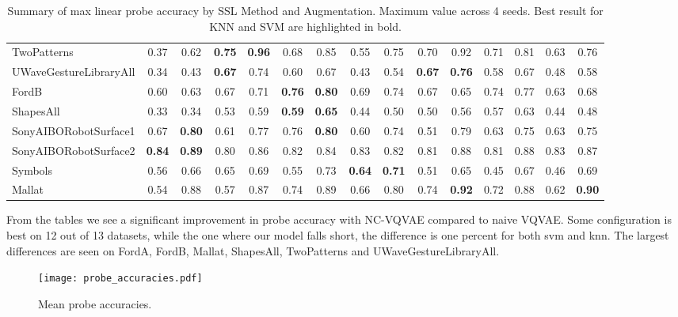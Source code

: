 \documentclass[../../thesis.tex]{subfiles}
\begin{document}
\begin{table}[H]
\begin{adjustbox}{width=\textwidth}
\begin{tabular}{lcc|cc|cc|cc|cc|cc|cc}
        TwoPatterns             & 0.37 & 0.62 & \textbf{0.75} & \textbf{0.96} & 0.68 & 0.85 & 0.55 & 0.75 & 0.70 & 0.92 & 0.71 & 0.81 & 0.63 & 0.76 \\
        UWaveGestureLibraryAll  & 0.34 & 0.43 & \textbf{0.67} & 0.74 & 0.60 & 0.67 & 0.43 & 0.54 & \textbf{0.67} & \textbf{0.76} & 0.58 & 0.67 & 0.48 & 0.58 \\
        FordB                   & 0.60 & 0.63 & 0.67 & 0.71 & \textbf{0.76} & \textbf{0.80} & 0.69 & 0.74 & 0.67 & 0.65 & 0.74 & 0.77 & 0.63 & 0.68 \\
        ShapesAll               & 0.33 & 0.34 & 0.53 & 0.59 & \textbf{0.59} & \textbf{0.65} & 0.44 & 0.50 & 0.50 & 0.56 & 0.57 & 0.63 & 0.44 & 0.48 \\
        SonyAIBORobotSurface1   & 0.67 & \textbf{0.80} & 0.61 & 0.77 & 0.76 & \textbf{0.80} & 0.60 & 0.74 & 0.51 & 0.79 & 0.63 & 0.75 & 0.63 & 0.75 \\
        SonyAIBORobotSurface2   & \textbf{0.84} & \textbf{0.89} & 0.80 & 0.86 & 0.82 & 0.84 & 0.83 & 0.82 & 0.81 & 0.88 & 0.81 & 0.88 & 0.83 & 0.87 \\
        Symbols                 & 0.56 & 0.66 & 0.65 & 0.69 & 0.55 & 0.73 & \textbf{0.64} & \textbf{0.71} & 0.51 & 0.65 & 0.45 & 0.67 & 0.46 & 0.69 \\
        Mallat                  & 0.54 & 0.88 & 0.57 & 0.87 & 0.74 & 0.89 & 0.66 & 0.80 & 0.74 & \textbf{0.92} & 0.72 & 0.88 & 0.62 & \textbf{0.90} \\


        \bottomrule
    \end{tabular}
    \end{adjustbox}
    
    \caption{Summary of max linear probe accuracy by SSL Method and Augmentation. Maximum value across 4 seeds. Best result for KNN and SVM are highlighted in bold.}
    \label{tab:best_probe}
\end{table}

From the tables we see a significant improvement in probe accuracy with NC-VQVAE compared to naive VQVAE. Some configuration is best on 12 out of 13 datasets, while the one where our model falls short, the difference is one percent for both svm and knn. The largest differences are seen on FordA, FordB, Mallat, ShapesAll, TwoPatterns and UWaveGestureLibraryAll. 


\begin{figure}[H]
    \label{fig:Mean_probe}
    \texttt{[image: probe\_accuracies.pdf]}
    \centering  
    \caption{Mean probe accuracies.}
\end{figure}
\end{document}
